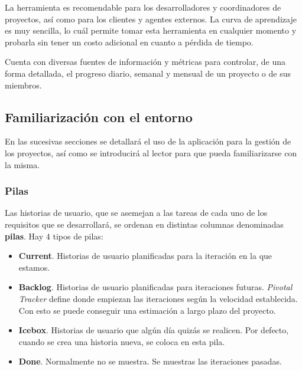   La herramienta es recomendable para los desarrolladores y coordinadores de proyectos, así como para los clientes y agentes externos. La curva de aprendizaje es muy sencilla, lo cuál permite tomar esta herramienta en cualquier momento y probarla sin tener un costo adicional en cuanto a pérdida de tiempo.

  Cuenta con diversas fuentes de información y métricas para controlar, de una forma detallada, el progreso diario, semanal y mensual de un proyecto o de sus miembros.
  
  \subsection{Familiarización con el entorno} %
    \label{sub:familiarizacion_con_el_entorno}
    
    En las sucesivas secciones se detallará el uso de la aplicación para la gestión de los proyectos, así como se introducirá al lector para que pueda familiarizarse con la misma.
    
    \subsubsection{Pilas} %
    \label{ssub:pilas}
      Las historias de usuario, que se asemejan a las tareas de cada uno de los requisitos que se desarrollará, se ordenan en distintas columnas denominadas {\bf pilas}. Hay 4 tipos de pilas:
      \begin{itemize}
        \item {\bf Current}. Historias de usuario planificadas para la iteración en la que estamos.
        \item {\bf Backlog}. Historias de usuario planificadas para iteraciones futuras. {\it Pivotal Tracker} define donde empiezan las iteraciones según la velocidad establecida. Con esto se puede conseguir una estimación a largo plazo del proyecto.
        \item {\bf Icebox}. Historias de usuario que algún día quizás se realicen. Por defecto, cuando se crea una historia nueva, se coloca en esta pila.
        \item {\bf Done}. Normalmente no se muestra. Se muestras las iteraciones pasadas. 
      \end{itemize}
      
